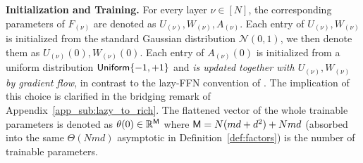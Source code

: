\documentclass[11pt]{article}
\let\citet\citep
\theoremstyle{plain}
\newcommand{\R}{\mathbb{R}}
\begin{document}


{\bf Initialization and Training. }
For every layer $\nu \in [N]$, the corresponding parameters of $F_{(\nu)}$ are denoted as $U_{(\nu)}, W_{(\nu)}, A_{(\nu)}$. Each entry of $U_{(\nu)}, W_{(\nu)}$ is initialized from the standard Gaussian distribution $\mathcal{N}(0, 1)$, we then denote them as $U_{(\nu)}(0), W_{(\nu)}(0)$. Each entry of $A_{(\nu)}(0)$ is initialized from a uniform distribution ${\sf Uniform}\{-1, +1\}$ and {\it is updated together with $U_{(\nu)}, W_{(\nu)}$ by gradient flow}, in contrast to the lazy-FFN convention of \citet{dzps19}. The implication of this choice is clarified in the bridging remark of Appendix~\ref{app_sub:lazy_to_rich}.
The flattened vector of the whole trainable parameters is denoted as $\theta(0) \in \R^{{\sf M}}$ where ${\sf M} = N(md+d^2)+Nmd$ (absorbed into the same $\Theta(Nmd)$ asymptotic in Definition~\ref{def:factors}) is the number of trainable parameters.
\end{document}
